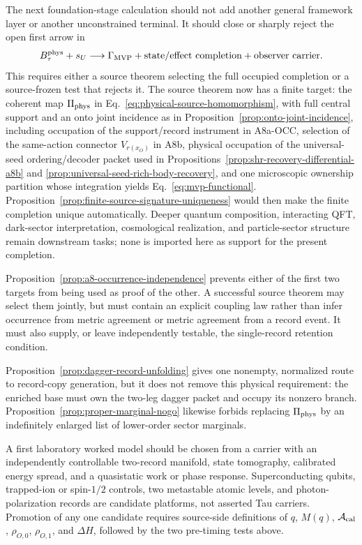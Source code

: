 \documentclass[11pt]{article}
\newcommand{\GMVP}{\Gamma_{\mathrm{MVP}}}
\begin{document}
The next foundation-stage calculation should not add another general
framework layer or another unconstrained terminal.  It should close or sharply
reject the open first arrow in
\[
  B_\tau^{\rm phys}+s_U
  \longrightarrow
  \GMVP+\text{state/effect completion}+\text{observer carrier}.
\]
This requires either a source theorem selecting the full occupied completion
or a source-frozen test that rejects it.  The source theorem now has a finite
target: the coherent map \(\Pi_{\rm phys}\) in
Eq.~\eqref{eq:physical-source-homomorphism}, with full central support and an
onto joint incidence as in Proposition~\ref{prop:onto-joint-incidence},
including occupation
of the support/record instrument in A8a-OCC, selection of the same-action
connector \(V_{r(x_O)}\) in A8b, physical occupation of the universal-seed
ordering/decoder packet used in
Propositions~\ref{prop:shr-recovery-differential-a8b} and
\ref{prop:universal-seed-rich-body-recovery}, and one microscopic ownership partition whose
integration yields Eq.~\eqref{eq:mvp-functional}.
Proposition~\ref{prop:finite-source-signature-uniqueness} would then make the finite
completion unique automatically.  Deeper quantum composition,
interacting QFT, dark-sector interpretation, cosmological realization, and
particle-sector structure remain downstream tasks; none is imported here as
support for the present completion.

Proposition~\ref{prop:a8-occurrence-independence} prevents either of the first
two targets from being used as proof of the other.  A successful source
theorem may select them jointly, but must contain an explicit coupling law
rather than infer occurrence from metric agreement or metric agreement from a
record event.  It must also supply, or leave independently testable, the
single-record retention condition.

Proposition~\ref{prop:dagger-record-unfolding} gives one nonempty, normalized
route to record-copy generation, but it does not remove this physical
requirement: the enriched base must own the two-leg dagger packet and occupy
its nonzero branch.  Proposition~\ref{prop:proper-marginal-nogo} likewise
forbids replacing \(\Pi_{\rm phys}\) by an indefinitely enlarged list of
lower-order sector marginals.

A first laboratory worked model should be chosen from a carrier with an
independently controllable two-record manifold, state tomography, calibrated
energy spread, and a quasistatic work or phase response.  Superconducting
qubits, trapped-ion or spin-\(1/2\) controls, two metastable atomic levels, and
photon-polarization records are candidate platforms, not asserted Tau
carriers.  Promotion of any one candidate requires source-side definitions of
\(q\), \(M(q)\), \(\mathcal A_{\rm cal}\), \(\rho_{O,0}\),
\(\rho_{O,1}\), and \(\Delta H\), followed by the two pre-timing tests above.
\end{document}
